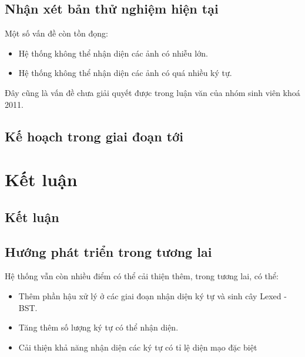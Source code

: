 \documentclass[a4paper,12pt]{article}
\begin{document}
	
	\vspace{0.5cm}
	\subsection{Nhận xét bản thử nghiệm hiện tại}
	
	Một số vấn đề còn tồn đọng: 
	\begin{itemize}
		\item Hệ thống không thể nhận diện các ảnh có nhiễu lớn.
		\item Hệ thống không thể nhận diện các ảnh có quá nhiều ký tự.
	\end{itemize}
	
	Đây cũng là vấn đề chưa giải quyết được trong luận văn của nhóm sinh viên khoá 2011.
	\subsection{Kế hoạch trong giai đoạn tới}
	
	
	
	\section{Kết luận}
	
	\subsection{Kết luận}
	
	\subsection{Hướng phát triển trong tương lai}
	
	Hệ thống vẫn còn nhiều điểm có thể cải thiện thêm, trong tương lai, có thể:
	\begin{itemize}
		\item Thêm phần hậu xử lý ở các giai đoạn nhận diện ký tự và sinh cây Lexed - BST.
		\item Tăng thêm số lượng ký tự có thể nhận diện.
		\item Cải thiện khả năng nhận diện các ký tự có tỉ lệ diện mạo đặc biệt
	\end{itemize}
	
	
	
	\newpage
	
	
\end{document}
